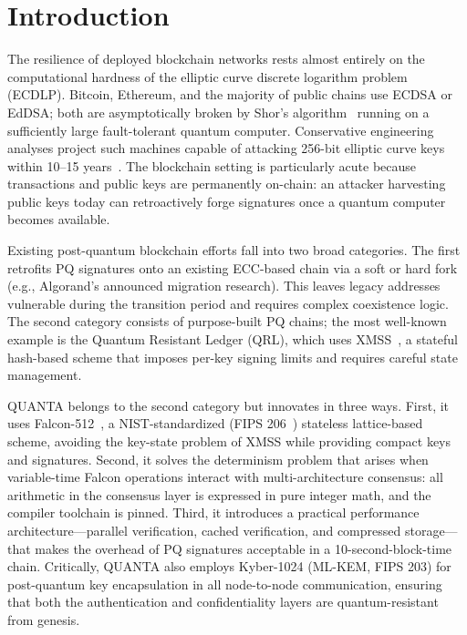 \documentclass[11pt,a4paper]{article}
\begin{document}
\section{Introduction}

The resilience of deployed blockchain networks rests almost entirely on the
computational hardness of the elliptic curve discrete logarithm problem
(ECDLP). Bitcoin, Ethereum, and the majority of public chains use ECDSA or
EdDSA; both are asymptotically broken by Shor's algorithm~\cite{shor1994}
running on a sufficiently large fault-tolerant quantum computer. Conservative
engineering analyses project such machines capable of attacking 256-bit
elliptic curve keys within 10--15 years~\cite{mosca2018,aggarwal2018}. The
blockchain setting is particularly acute because transactions and public keys
are permanently on-chain: an attacker harvesting public keys today can
retroactively forge signatures once a quantum computer becomes available.

Existing post-quantum blockchain efforts fall into two broad categories.
The first retrofits PQ signatures onto an existing ECC-based chain via a soft
or hard fork (e.g., Algorand's announced migration research). This leaves
legacy addresses vulnerable during the transition period and requires complex
coexistence logic. The second category consists of purpose-built PQ chains;
the most well-known example is the Quantum Resistant Ledger (QRL), which uses
XMSS~\cite{hulsing2018}, a stateful hash-based scheme that imposes per-key
signing limits and requires careful state management.

QUANTA belongs to the second category but innovates in three ways.
First, it uses Falcon-512~\cite{falcon2020}, a NIST-standardized (FIPS
206~\cite{fips206}) stateless lattice-based scheme, avoiding the key-state
problem of XMSS while providing compact keys and signatures.
Second, it solves the determinism problem that arises when variable-time
Falcon operations interact with multi-architecture consensus: all arithmetic
in the consensus layer is expressed in pure integer math, and the compiler
toolchain is pinned.
Third, it introduces a practical performance architecture---parallel
verification, cached verification, and compressed storage---that makes the
overhead of PQ signatures acceptable in a 10-second-block-time chain.
Critically, QUANTA also employs Kyber-1024 (ML-KEM, FIPS 203) for
post-quantum key encapsulation in all node-to-node communication, ensuring
that both the authentication and confidentiality layers are quantum-resistant
from genesis.
\end{document}
